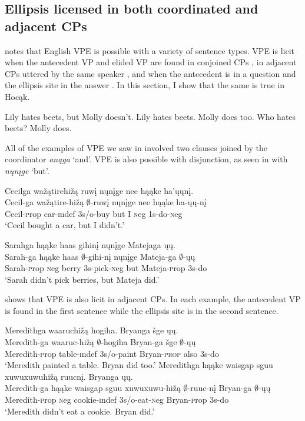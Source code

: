 \documentclass[output=paper]{LSP/langsci}
\begin{document}
\subsection{Ellipsis licensed in both coordinated and adjacent CPs}\label{sec:johnson:3.1}

\citet{Goldberg2005} notes that English VPE is possible with a variety of sentence types. VPE is licit when the antecedent VP and elided VP are found in conjoined CPs , in adjacent CPs uttered by the same speaker , and when the antecedent is in a question and the ellipsis site in the answer . In this section, I show that the same is true in Hocąk.
 
\ea\label{ex:johnson:25}
\ea\label{ex:johnson:25a}
Lily hates beets, but Molly doesn't.
\ex\label{ex:johnson:25b}
Lily hates beets. Molly does too.
\ex\label{ex:johnson:25c} 
Who hates beets? Molly does.
\z
\z

All of the examples of VPE we saw in  involved two clauses joined by the coordinator \emph{anąga} `and'. VPE is also possible with disjunction, as seen in  with \emph{nųnįge} `but'.
 
\ea\label{ex:johnson:26}
\ea 
\glll Cecilga wažątirehižą ruwį nųnįge nee hąąke ha'ųųnį.\\
Cecil-ga wažątire-hižą $\emptyset$-ruwį nųnįge nee hąąke ha-ųų-nį\\
Cecil-{\textsc prop} car-{\textsc indef} {\textsc 3s/o}-buy but I {\textsc neg} {\textsc 1s}-do-{\textsc neg}\\
\trans `Cecil bought a car, but I didn't.'

\ex 
\glll Sarahga hąąke haas gihinį nųnįge Matejaga ųų.\\
Sarah-ga hąąke haas $\emptyset$-gihi-nį nųnįge Mateja-ga $\emptyset$-ųų\\
Sarah-{\textsc prop} {\textsc neg} berry {\textsc 3s}-pick-{\textsc neg} but Mateja-{\textsc prop} {\textsc 3s}-do\\
\trans `Sarah didn't pick berries, but Mateja did.'
\z
\z


 shows that VPE is also licit in adjacent CPs. In each example, the antecedent VP is found in the first sentence while the ellipsis site is in the second sentence.
 
\ea\label{ex:johnson:27}
\ea 
\glll Meredithga waaruchižą hogiha. Bryanga šge ųų.\\
Meredith-ga waaruc-hižą $\emptyset$-hogiha Bryan-ga šge $\emptyset$-ųų\\
Meredith-{\textsc prop} table-{\textsc indef} {\textsc 3s/o}-paint Bryan-\textsc{prop} also {\textsc 3s}-do\\
\trans `Meredith painted a table. Bryan did too.'
\ex 
\glll Meredithga hąąke {waisgap sguu xuwuxuwuhižą} ruucnį. Bryanga ųų.\\
Meredith-ga hąąke {waisgap sguu xuwuxuwu-hižą} $\emptyset$-ruuc-nį Bryan-ga $\emptyset$-ųų\\
Meredith-{\textsc prop} {\textsc neg} cookie-{\textsc indef} {\textsc 3s/o}-eat-{\textsc neg} Bryan-{\textsc prop} {\textsc 3s}-do\\
\trans `Meredith didn't eat a cookie. Bryan did.'
\z
\z
\end{document}
